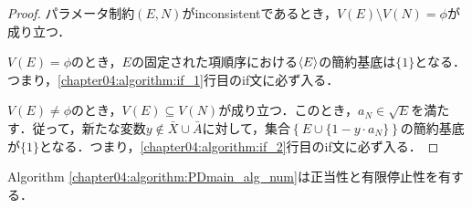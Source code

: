 \begin{proof}
	パラメータ制約$(E, N)$がinconsistentであるとき，$V(E) \setminus V(N) = \phi$が成り立つ．
	\par
	$V(E) = \phi$のとき，$E$の固定された項順序における$\langle E \rangle$の簡約\groebner{}基底は$\{1\}$となる．つまり，\ref{chapter04:algorithm:if_1}行目のif文に必ず入る．
	\par
	$V(E) \ne \phi$のとき，$V(E) \subseteq V(N)$が成り立つ．このとき，$a_N \in \sqrt{E}$を満たす．従って，新たな変数$y \notin \bar{X}\cup \bar{A}$に対して，集合$\left\{E \cup \{1 - y \cdot a_N\}\right\}$の簡約\groebner{}基底が$\{1\}$となる．つまり，\ref{chapter04:algorithm:if_2}行目のif文に必ず入る．

\end{proof}

\begin{theorem}
	Algorithm \ref{chapter04:algorithm:PDmain_alg_num}は正当性と有限停止性を有する．
\end{theorem}


